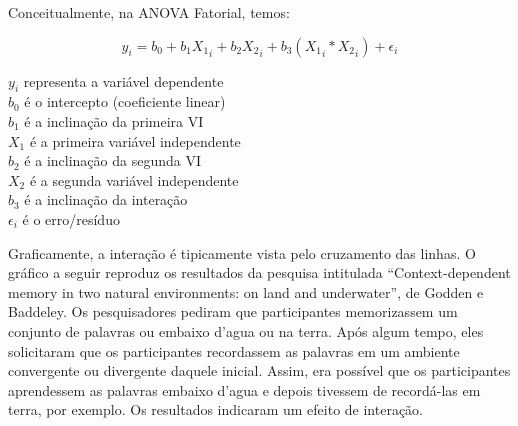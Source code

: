 \documentclass[
]{book}
\begin{document}
Conceitualmente, na ANOVA Fatorial, temos:

\[y_i = b_0 + b_1X{_1}_i + b_2X{_2}_i + b_3(X{_1}_i * X{_2}_i) + \epsilon_{i}\]

\(y_i\) representa a variável dependente\\
\(b_0\) é o intercepto (coeficiente linear)\\
\(b_1\) é a inclinação da primeira VI\\
\(X_1\) é a primeira variável independente\\
\(b_2\) é a inclinação da segunda VI\\
\(X_2\) é a segunda variável independente\\
\(b_3\) é a inclinação da interação\\
\(\epsilon_{i}\) é o erro/resíduo

Graficamente, a interação é tipicamente vista pelo cruzamento das
linhas. O gráfico a seguir reproduz os resultados da pesquisa intitulada
``Context-dependent memory in two natural environments: on land and
underwater'', de Godden e Baddeley. Os pesquisadores pediram que
participantes memorizassem um conjunto de palavras ou embaixo d'agua ou
na terra. Após algum tempo, eles solicitaram que os participantes
recordassem as palavras em um ambiente convergente ou divergente daquele
inicial. Assim, era possível que os participantes aprendessem as
palavras embaixo d'agua e depois tivessem de recordá-las em terra, por
exemplo. Os resultados indicaram um efeito de interação.
\end{document}
